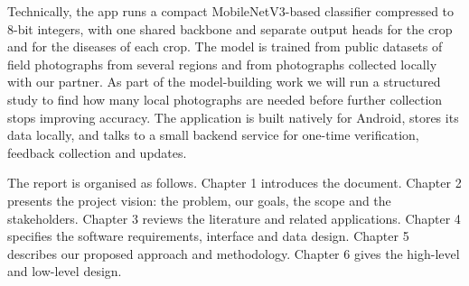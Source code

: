 Technically, the app runs a compact MobileNetV3-based classifier compressed to 8-bit integers, with one shared backbone and separate output heads for the crop and for the diseases of each crop. The model is trained from public datasets of field photographs from several regions and from photographs collected locally with our partner. As part of the model-building work we will run a structured study to find how many local photographs are needed before further collection stops improving accuracy. The application is built natively for Android, stores its data locally, and talks to a small backend service for one-time verification, feedback collection and updates.

The report is organised as follows. Chapter 1 introduces the document. Chapter 2 presents the project vision: the problem, our goals, the scope and the stakeholders. Chapter 3 reviews the literature and related applications. Chapter 4 specifies the software requirements, interface and data design. Chapter 5 describes our proposed approach and methodology. Chapter 6 gives the high-level and low-level design.
\pagebreak
